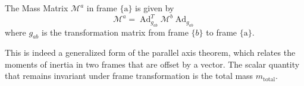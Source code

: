 The Mass Matrix \( \mathcal{M}^{a} \) in frame \( \{\mathrm{a}\} \) is given by
\begin{equation}
    \mathcal{M}^{a}=\operatorname{Ad}_{g_{a b}}^{T} \mathcal{M}^{b} \operatorname{Ad}_{g_{a b}}
\end{equation}
where \( g_{a b} \) is the transformation matrix from frame \( \{b\} \) to frame \( \{\mathrm{a}\} \).

This is indeed a generalized form of the parallel axis theorem, which relates the moments of inertia in two frames that are offset by a vector.
The scalar quantity that remains invariant under frame transformation is the total mass \( m_{\text{total}} \).
